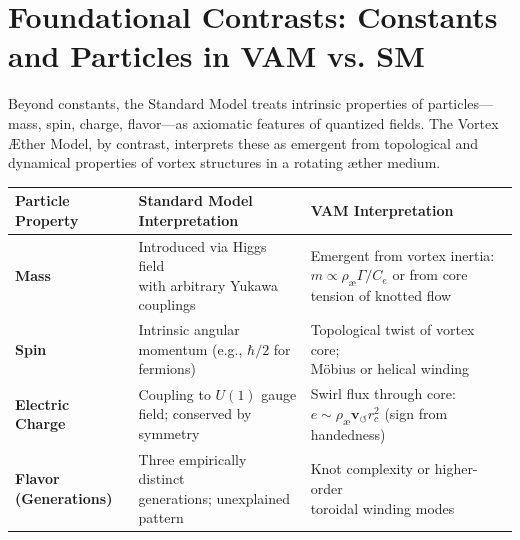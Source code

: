 \section*{Foundational Contrasts: Constants and Particles in VAM vs. SM}

Beyond constants, the Standard Model treats intrinsic properties of particles—mass, spin, charge, flavor—as axiomatic features of quantized fields. The Vortex Æther Model, by contrast, interprets these as emergent from topological and dynamical properties of vortex structures in a rotating æther medium.

\begin{table}[H]
    \centering
    \footnotesize
    \renewcommand{\arraystretch}{1.3}
    \begin{tabular}{|l|l|l|}
        \hline
        \textbf{Particle Property} & \textbf{Standard Model Interpretation} & \textbf{VAM Interpretation} \\
        \hline

        \textbf{Mass} &
        \makecell[l]{Introduced via Higgs field \\ with arbitrary Yukawa couplings} &
        \makecell[l]{Emergent from vortex inertia: \\ $m \propto \rho_\text{\ae} \Gamma / C_e$ \\ or from core tension of knotted flow} \\
        \hline

        \textbf{Spin} &
        \makecell[l]{Intrinsic angular momentum \\ (e.g., $\hbar/2$ for fermions)} &
        \makecell[l]{Topological twist of vortex core; \\ Möbius or helical winding} \\
        \hline

        \textbf{Electric Charge} &
        \makecell[l]{Coupling to $U(1)$ gauge field; \\ conserved by symmetry} &
        \makecell[l]{Swirl flux through core: \\ $e \sim \rho_\text{\ae} \mathbf{v}_{\scriptscriptstyle\boldsymbol{\circlearrowleft}} r_c^2$ \\ (sign from handedness)} \\
        \hline

        \textbf{Flavor (Generations)} &
        \makecell[l]{Three empirically distinct \\ generations; unexplained pattern} &
        \makecell[l]{Knot complexity or higher-order \\ toroidal winding modes} \\
        \hline


\end{tabular}
\end{table}
